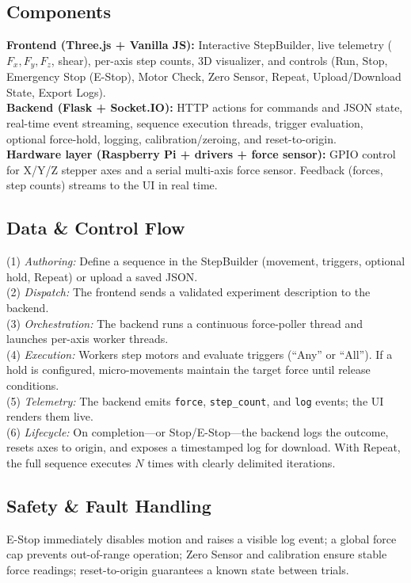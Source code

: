 \documentclass[
    twocolumn,
    fontsize = 10pt,
    parskip = half+,
    headings = small,
    headwidth = text,
    footwidth = text,
]{scrartcl}
\begin{document}
\subsection{Components}
\textbf{Frontend (Three.js + Vanilla JS):} Interactive StepBuilder, live telemetry ($F_x, F_y, F_z$, shear), per-axis step counts, 3D visualizer, and controls (Run, Stop, Emergency Stop (E-Stop), Motor Check, Zero Sensor, Repeat, Upload/Download State, Export Logs).\\
\textbf{Backend (Flask + Socket.IO):} HTTP actions for commands and JSON state, real-time event streaming, sequence execution threads, trigger evaluation, optional force-hold, logging, calibration/zeroing, and reset-to-origin.\\
\textbf{Hardware layer (Raspberry Pi + drivers + force sensor):} GPIO control for X/Y/Z stepper axes and a serial multi-axis force sensor. Feedback (forces, step counts) streams to the UI in real time.

\subsection{Data \& Control Flow}
(1) \emph{Authoring:} Define a sequence in the StepBuilder (movement, triggers, optional hold, Repeat) or upload a saved JSON.\\

(2) \emph{Dispatch:} The frontend sends a validated experiment description to the backend.\\

(3) \emph{Orchestration:} The backend runs a continuous force-poller thread and launches per-axis worker threads.\\

(4) \emph{Execution:} Workers step motors and evaluate triggers (``Any'' or ``All''). If a hold is configured, micro-movements maintain the target force until release conditions.\\

(5) \emph{Telemetry:} The backend emits \texttt{force}, \texttt{step\_count}, and \texttt{log} events; the UI renders them live.\\

(6) \emph{Lifecycle:} On completion—or Stop/E-Stop—the backend logs the outcome, resets axes to origin, and exposes a timestamped log for download. With Repeat, the full sequence executes $N$ times with clearly delimited iterations.

\subsection{Safety \& Fault Handling}
E-Stop immediately disables motion and raises a visible log event; a global force cap prevents out-of-range operation; Zero Sensor and calibration ensure stable force readings; reset-to-origin guarantees a known state between trials.
\end{document}

